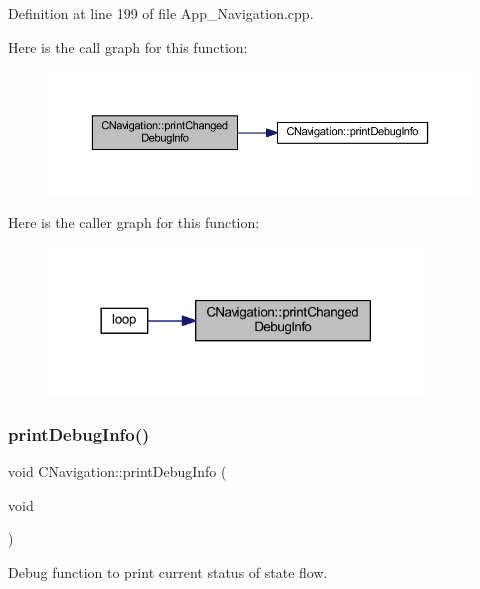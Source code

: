 Definition at line 199 of file App\+\_\+\+Navigation.\+cpp.

Here is the call graph for this function\+:
\nopagebreak
\begin{figure}[H]
\begin{center}
\leavevmode
\includegraphics[width=350pt]{class_c_navigation_ac491c77788ba2e953a704b6ad622a665_cgraph}
\end{center}
\end{figure}
Here is the caller graph for this function\+:
\nopagebreak
\begin{figure}[H]
\begin{center}
\leavevmode
\includegraphics[width=282pt]{class_c_navigation_ac491c77788ba2e953a704b6ad622a665_icgraph}
\end{center}
\end{figure}
\mbox{\label{class_c_navigation_a84e320cd8975593ab6f966e8794b2886}} 
\subsubsection{\texorpdfstring{printDebugInfo()}{printDebugInfo()}}
{\footnotesize\ttfamily void C\+Navigation\+::print\+Debug\+Info (\begin{DoxyParamCaption}\item[{void}]{ }\end{DoxyParamCaption})\hspace{0.3cm}{\ttfamily [virtual]}}



Debug function to print current status of state flow. 



